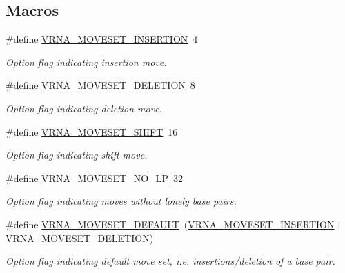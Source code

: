 \subsection*{Macros}
\begin{DoxyCompactItemize}
\item 
\#define \hyperlink{group__neighbors_gaf39028db9c70d3be528929182a3f2d5a}{V\+R\+N\+A\+\_\+\+M\+O\+V\+E\+S\+E\+T\+\_\+\+I\+N\+S\+E\+R\+T\+I\+ON}~4
\begin{DoxyCompactList}\small\item\em Option flag indicating insertion move. \end{DoxyCompactList}\item 
\#define \hyperlink{group__neighbors_gac05db9392c6647e3e9a6982096c5b384}{V\+R\+N\+A\+\_\+\+M\+O\+V\+E\+S\+E\+T\+\_\+\+D\+E\+L\+E\+T\+I\+ON}~8
\begin{DoxyCompactList}\small\item\em Option flag indicating deletion move. \end{DoxyCompactList}\item 
\#define \hyperlink{group__neighbors_ga68ea27c81de4b74e48b775c04052590b}{V\+R\+N\+A\+\_\+\+M\+O\+V\+E\+S\+E\+T\+\_\+\+S\+H\+I\+FT}~16
\begin{DoxyCompactList}\small\item\em Option flag indicating shift move. \end{DoxyCompactList}\item 
\#define \hyperlink{group__neighbors_ga258084b251b218fba9398826435a4393}{V\+R\+N\+A\+\_\+\+M\+O\+V\+E\+S\+E\+T\+\_\+\+N\+O\+\_\+\+LP}~32
\begin{DoxyCompactList}\small\item\em Option flag indicating moves without lonely base pairs. \end{DoxyCompactList}\item 
\#define \hyperlink{group__neighbors_gaa5ffec4dd0d02df320f123e6888154d1}{V\+R\+N\+A\+\_\+\+M\+O\+V\+E\+S\+E\+T\+\_\+\+D\+E\+F\+A\+U\+LT}~(\hyperlink{group__neighbors_gaf39028db9c70d3be528929182a3f2d5a}{V\+R\+N\+A\+\_\+\+M\+O\+V\+E\+S\+E\+T\+\_\+\+I\+N\+S\+E\+R\+T\+I\+ON} $\vert$ \hyperlink{group__neighbors_gac05db9392c6647e3e9a6982096c5b384}{V\+R\+N\+A\+\_\+\+M\+O\+V\+E\+S\+E\+T\+\_\+\+D\+E\+L\+E\+T\+I\+ON})
\begin{DoxyCompactList}\small\item\em Option flag indicating default move set, i.\+e. insertions/deletion of a base pair. \end{DoxyCompactList}\end{DoxyCompactItemize}
